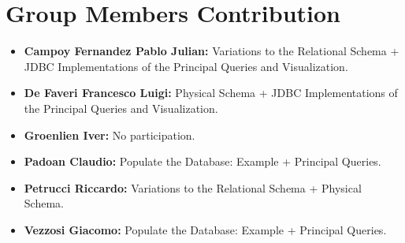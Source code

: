 \documentclass{article}
\begin{document}
\maketitle







\section{Group Members Contribution}

\begin{itemize}
    \item \textbf{Campoy Fernandez Pablo Julian:} Variations to the Relational Schema + JDBC Implementations of the Principal Queries and Visualization.
    \item \textbf{De Faveri Francesco Luigi:} Physical Schema + JDBC Implementations of the Principal Queries and Visualization.
    \item \textbf{Groenlien Iver:} No participation.
    \item \textbf{Padoan Claudio:} Populate the Database: Example + Principal Queries.
    \item \textbf{Petrucci Riccardo:} Variations to the Relational Schema + Physical Schema.
    \item \textbf{Vezzosi Giacomo:} Populate the Database: Example + Principal Queries.
\end{itemize}
\end{document}
